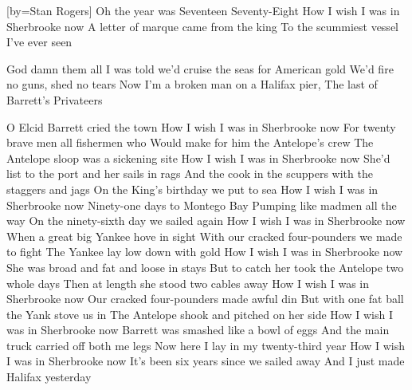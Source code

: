 [by={Stan Rogers}]
\beginverse\singlespacing
Oh the year was Seventeen Seventy-Eight
How I wish I was in Sherbrooke now
A letter of marque came from the king
To the scummiest vessel I've ever seen
\endverse

\beginchorus \singlespacing
God damn them all
I was told we'd cruise the seas for American gold
We'd fire no guns, shed no tears
Now I'm a broken man on a Halifax pier,
The last of Barrett's Privateers
\endchorus

\beginverse\singlespacing
O Elcid Barrett cried the town
How I wish I was in Sherbrooke now
For twenty brave men all fishermen who
Would make for him the Antelope's crew
\endverse
{}
\beginverse\singlespacing
The Antelope sloop was a sickening site
How I wish I was in Sherbrooke now
She'd list to the port and her sails in rags
And the cook in the scuppers with the staggers and jags
\endverse
{}
\beginverse\singlespacing
On the King's birthday we put to sea
How I wish I was in Sherbrooke now
Ninety-one days to Montego Bay
Pumping like madmen all the way
\endverse
{}
\beginverse\singlespacing
On the ninety-sixth day we sailed again
How I wish I was in Sherbrooke now
When a great big Yankee hove in sight
With our cracked four-pounders we made to fight
\endverse
{}
\beginverse\singlespacing
The Yankee lay low down with gold
How I wish I was in Sherbrooke now
She was broad and fat and loose in stays
But to catch her took the Antelope two whole days
\endverse
{}
\beginverse\singlespacing
Then at length she stood two cables away
How I wish I was in Sherbrooke now
Our cracked four-pounders made awful din
But with one fat ball the Yank stove us in
\endverse
{}
\beginverse\singlespacing
The Antelope shook and pitched on her side
How I wish I was in Sherbrooke now
Barrett was smashed like a bowl of eggs
And the main truck carried off both me legs
\endverse
{}
\beginverse\singlespacing
Now here I lay in my twenty-third year
How I wish I was in Sherbrooke now
It's been six years since we sailed away
And I just made Halifax yesterday
\endverse
{}
\endsong
